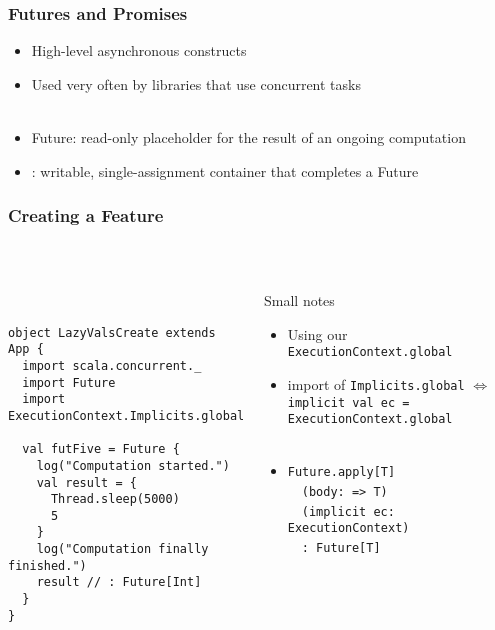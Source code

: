 \documentclass[aspectratio=169]{beamer}
\begin{document}
\begin{frame}[t]\frametitle{Futures and Promises}

\begin{itemize}
  \item High-level asynchronous constructs
  \item Used very often by libraries that use concurrent tasks
  \\~
  \item \alert{Future}:
    read-only placeholder for the result of an ongoing computation
  \item {}:
    writable, single-assignment container that completes a Future
\end{itemize}

\end{frame}

\begin{frame}[fragile]\frametitle{Creating a Feature}
~\\[-8mm]
\begin{columns}
\begin{column}{0.56\textwidth}
~\\
\begin{lstlisting}[emph={execute,sleep,log,Future}]
object LazyValsCreate extends App {
  import scala.concurrent._
  import Future
  import ExecutionContext.Implicits.global
  
  val futFive = Future {
    log("Computation started.")
    val result = {
      Thread.sleep(5000)
      5
    }
    log("Computation finally finished.")
    result // : Future[Int]
  }
}
\end{lstlisting}
\end{column}
\begin{column}{0.46\textwidth}
\begin{block}{Small notes}
\begin{itemize}
  \item Using our \texttt{ExecutionContext.global}
  \item import of \texttt{Implicits.global} $\Leftrightarrow$
  \\ \texttt{implicit val ec = ExecutionContext.global}
  \pause\\~
  \\\item{\footnotesize\texttt{Future.apply[T]}}
  \\~~{\footnotesize\texttt{(body: => T)}}
  \\~~{\footnotesize\texttt{(implicit ec: ExecutionContext)}}
  \\~~{\footnotesize\texttt{: Future[T]}}
\end{itemize}
\end{block}
\end{column}
\end{columns}
\end{frame}
\end{document}
